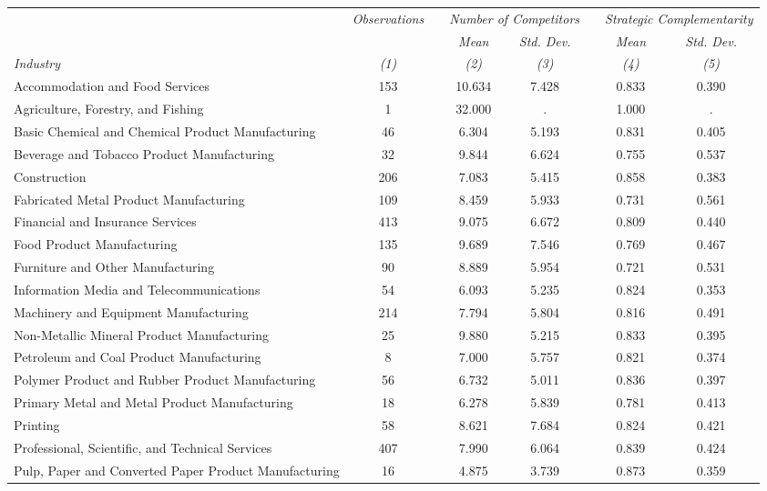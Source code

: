 \begin{tabular}{lccccccc} \toprule
& \emph{Observations} & & \multicolumn{2}{c}{\emph{Number of Competitors}} & & \multicolumn{2}{c}{\emph{Strategic Complementarity}} \\ \cline{2-2} \cline{4-5} \cline{7-8}
& & & \emph{Mean} & \emph{Std. Dev.} & & \emph{Mean} & \emph{Std. Dev.} \\
\emph{Industry} & \emph{(1)} & & \emph{(2)} & \emph{(3)} & & \emph{(4)} & \emph{(5)} \\ \midrule
Accommodation and Food Services & 153 & & 10.634 & 7.428 & & 0.833 & 0.390 \\
Agriculture, Forestry, and Fishing & 1 & & 32.000 &    . & & 1.000 &    . \\
Basic Chemical and Chemical Product Manufacturing & 46 & & 6.304 & 5.193 & & 0.831 & 0.405 \\
Beverage and Tobacco Product Manufacturing & 32 & & 9.844 & 6.624 & & 0.755 & 0.537 \\
Construction & 206 & & 7.083 & 5.415 & & 0.858 & 0.383 \\
Fabricated Metal Product Manufacturing & 109 & & 8.459 & 5.933 & & 0.731 & 0.561 \\
Financial and Insurance Services & 413 & & 9.075 & 6.672 & & 0.809 & 0.440 \\
Food Product Manufacturing & 135 & & 9.689 & 7.546 & & 0.769 & 0.467 \\
Furniture and Other Manufacturing & 90 & & 8.889 & 5.954 & & 0.721 & 0.531 \\
Information Media and Telecommunications & 54 & & 6.093 & 5.235 & & 0.824 & 0.353 \\
Machinery and Equipment Manufacturing & 214 & & 7.794 & 5.804 & & 0.816 & 0.491 \\
Non-Metallic Mineral Product Manufacturing & 25 & & 9.880 & 5.215 & & 0.833 & 0.395 \\
Petroleum and Coal Product Manufacturing & 8 & & 7.000 & 5.757 & & 0.821 & 0.374 \\
Polymer Product and Rubber Product Manufacturing & 56 & & 6.732 & 5.011 & & 0.836 & 0.397 \\
Primary Metal and Metal Product Manufacturing & 18 & & 6.278 & 5.839 & & 0.781 & 0.413 \\
Printing & 58 & & 8.621 & 7.684 & & 0.824 & 0.421 \\
Professional, Scientific, and Technical Services & 407 & & 7.990 & 6.064 & & 0.839 & 0.424 \\
Pulp, Paper and Converted Paper Product Manufacturing & 16 & & 4.875 & 3.739 & & 0.873 & 0.359 \\

\end{tabular}
